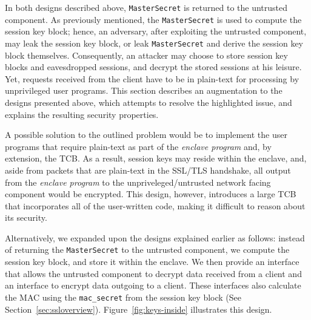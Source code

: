 \documentclass[../../main.tex]{subfiles}
\begin{document}
In both designs described above, \texttt{MasterSecret} is returned to
the untrusted component. As previously mentioned, the
\texttt{MasterSecret} is used to compute the session key block; hence,
an adversary, after exploiting the untrusted component, may leak the
session key block, or leak \texttt{MasterSecret} and derive the
session key block themselves. Consequently, an attacker may choose
to store session key blocks and eavesdropped sessions, and decrypt the
stored sessions at his leisure. Yet, requests received from the client
have to be in plain-text for processing by unprivileged user programs.
This section describes an augmentation to the designs presented above,
which attempts to resolve the highlighted issue, and explains the
resulting security properties.

A possible solution to the outlined problem would be to implement the
user programs that require plain-text as part of the \textit{enclave
  program} and, by extension, the TCB. As a result, session keys may
reside within the enclave, and, aside from packets that are plain-text
in the SSL/TLS handshake, all output from the \textit{enclave program}
to the unpriveleged/untrusted network facing component would be
encrypted. This design, however, introduces a large TCB that
incorporates all of the user-written code, making it difficult to
reason about its security.

Alternatively, we expanded upon the designs explained earlier as
follows: instead of returning the \texttt{MasterSecret} to the
untrusted component, we compute the session key block, and store it
within the enclave. We then provide an interface that allows the
untrusted component to decrypt data received from a client and an
interface to encrypt data outgoing to a client. These interfaces also
calculate the MAC using the \texttt{mac\_secret} from the session key
block (See Section~\ref{sec:ssloverview}).
Figure~\ref{fig:keys-inside} illustrates this design.
\end{document}
